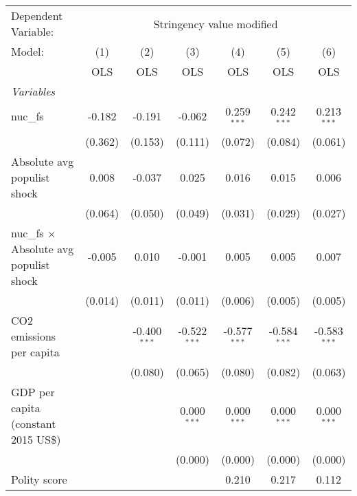 
\begingroup
\centering
\begin{tabular}{lcccccc}
   \toprule
   Dependent Variable: & \multicolumn{6}{c}{Stringency value modified}\\
   Model:                                         & (1)     & (2)            & (3)            & (4)            & (5)            & (6)\\  
                                                  &  OLS    & OLS            & OLS            & OLS            & OLS            & OLS\\  
   \midrule
   \emph{Variables}\\
   nuc\_fs                                        & -0.182  & -0.191         & -0.062         & 0.259$^{***}$  & 0.242$^{***}$  & 0.213$^{***}$\\   
                                                  & (0.362) & (0.153)        & (0.111)        & (0.072)        & (0.084)        & (0.061)\\   
   Absolute avg populist shock                    & 0.008   & -0.037         & 0.025          & 0.016          & 0.015          & 0.006\\   
                                                  & (0.064) & (0.050)        & (0.049)        & (0.031)        & (0.029)        & (0.027)\\   
   nuc\_fs $\times$ Absolute avg populist shock   & -0.005  & 0.010          & -0.001         & 0.005          & 0.005          & 0.007\\   
                                                  & (0.014) & (0.011)        & (0.011)        & (0.006)        & (0.005)        & (0.005)\\   
   CO2 emissions per capita                       &         & -0.400$^{***}$ & -0.522$^{***}$ & -0.577$^{***}$ & -0.584$^{***}$ & -0.583$^{***}$\\   
                                                  &         & (0.080)        & (0.065)        & (0.080)        & (0.082)        & (0.063)\\   
   GDP per capita (constant 2015 US\$)            &         &                & 0.000$^{***}$  & 0.000$^{***}$  & 0.000$^{***}$  & 0.000$^{***}$\\   
                                                  &         &                & (0.000)        & (0.000)        & (0.000)        & (0.000)\\   
   Polity score                                   &         &                &                & 0.210          & 0.217          & 0.112\\   

\end{tabular}
